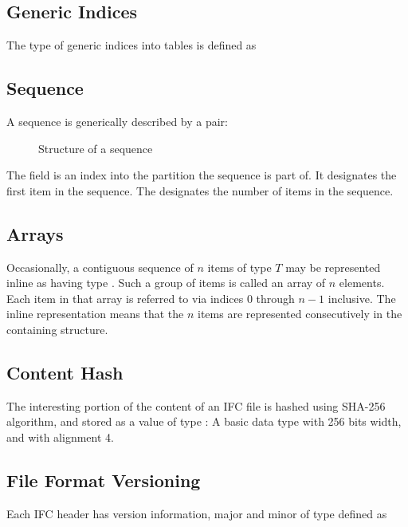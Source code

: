 \subsection{Generic Indices}
\label{sec:ifc-index-type}
The type of generic indices into tables is defined as 

\subsection{Sequence}
\label{sec:ifc-sequence}
A sequence is generically described by a pair:
%
\begin{figure}[H]
	\centering
	\caption{Structure of a sequence}
	\label{fig:ifc-sequence-structure}
\end{figure}
%
The  field is an index into the partition the sequence is part of.  It designates the first item in the sequence.
The  designates the number of items in the sequence.

\subsection{Arrays}
\label{sec:ifc-array-type}
Occasionally, a contiguous sequence of $n$ items of type $T$ may be represented inline as having type .
Such a group of items is called an array of $n$ elements.  Each item in that array is referred to via indices 
$0$ through $n-1$ inclusive.
The inline representation means that the $n$ items are represented consecutively in the containing structure.

\subsection{Content Hash}
\label{sec:content-sha256-hash}
The interesting portion of the content of an IFC file is hashed using SHA-256 algorithm, and stored as a value of type :
A basic data type with 256 bits width, and with alignment 4.

\subsection{File Format Versioning}
\label{sec:ifc-versioning-data-type}

Each IFC header has version information, major and minor of type defined as 

